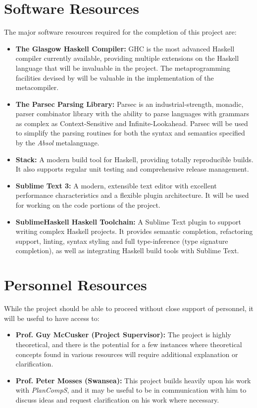\documentclass[a4paper,11pt]{report}
\begin{document}
\section{Software Resources} %
\label{sec:software_resources}
The major software resources required for the completion of this project are:
\begin{itemize}
    \item \textbf{The Glasgow Haskell Compiler:} GHC is the most advanced Haskell compiler currently available, providing multiple extensions on the Haskell language that will be invaluable in the project.
    The metaprogramming facilities devised by \cite{sheard2002template} will be valuable in the implementation of the metacompiler. 
    \item \textbf{The Parsec Parsing Library:} Parsec is an industrial-strength, monadic, parser combinator library with the ability to parse languages with grammars as complex as Context-Sensitive and Infinite-Lookahead.
    Parsec will be used to simplify the parsing routines for both the syntax and semantics specified by the \textit{Absol} metalanguage.
    \item \textbf{Stack:} A modern build tool for Haskell, providing totally reproducible builds. 
    It also supports regular unit testing and comprehensive release management.
    \item \textbf{Sublime Text 3:} A modern, extensible text editor with excellent performance characteristics and a flexible plugin architecture.
    It will be used for working on the code portions of the project.
    \item \textbf{SublimeHaskell Haskell Toolchain:} A Sublime Text plugin to support writing complex Haskell projects. 
    It provides semantic completion, refactoring support, linting, syntax styling and full type-inference (type signature completion), as well as integrating Haskell build tools with Sublime Text.
\end{itemize}


\section{Personnel Resources} %
\label{sec:personnel_resources}
While the project should be able to proceed without close support of personnel, it will be useful to have access to:
\begin{itemize}
    \item \textbf{Prof. Guy McCusker (Project Supervisor):} The project is highly theoretical, and there is the potential for a few instances where theoretical concepts found in various resources will require additional explanation or clarification.
    \item \textbf{Prof. Peter Mosses (Swansea):} This project builds heavily upon his work with \textit{PlanCompS}, and it may be useful to be in communication with him to discuss ideas and request clarification on his work where necessary.
\end{itemize}
\end{document}
